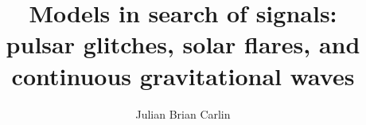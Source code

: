 \title{{\Huge Models in search of signals:}\\
\vspace{10pt} {\Large pulsar glitches, solar flares, and} \\
\vspace{8pt} {\Large continuous gravitational waves}}
\author{Julian Brian Carlin}
